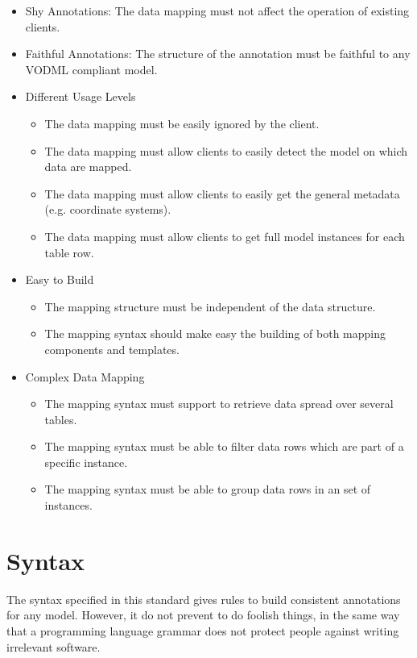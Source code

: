 \documentclass[11pt,a4paper]{ivoa}
\begin{document}
\begin{itemize}
\item Shy Annotations: The data mapping must not affect the operation of existing clients.

\item Faithful Annotations: The structure of the annotation must be faithful to any VODML compliant model. 


\item Different Usage Levels 
\begin{itemize}
   \item The data mapping must be easily ignored by the client.
   \item The data mapping must allow clients to easily detect the model on which data are mapped.
   \item The data mapping must allow clients to easily get the general metadata (e.g. coordinate systems).
   \item The data mapping must allow clients to get full model instances for each table row.
\end{itemize}

\item Easy to Build 
\begin{itemize}
   \item The mapping structure must be independent of the data structure.
   \item The mapping syntax should make easy the building of both mapping components and templates.
\end{itemize}

\item Complex Data Mapping 
\begin{itemize}
   \item The mapping syntax must support to retrieve data spread over several tables.
   \item The mapping syntax must be able to filter data rows which are part of a specific instance.
   \item The mapping syntax must be able to group data rows in an set of instances.
\end{itemize}
\end{itemize}


\section{Syntax}


The syntax specified in this standard gives rules to build consistent annotations for any model. However, it do not prevent to do foolish things, in the same way that a programming language grammar does not protect people against writing irrelevant software.
\end{document}
